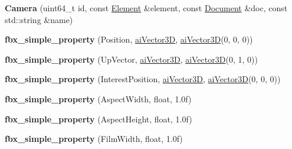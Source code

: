 \begin{DoxyCompactItemize}
\item 
\hypertarget{class_assimp_1_1_f_b_x_1_1_camera_afc7986cd32d068eb66a4b7536da0b2d3}{{\bfseries Camera} (uint64\+\_\+t id, const \hyperlink{class_assimp_1_1_f_b_x_1_1_element}{Element} \&element, const \hyperlink{class_assimp_1_1_f_b_x_1_1_document}{Document} \&doc, const std\+::string \&name)}\label{class_assimp_1_1_f_b_x_1_1_camera_afc7986cd32d068eb66a4b7536da0b2d3}

\item 
\hypertarget{class_assimp_1_1_f_b_x_1_1_camera_a432283ac3a72ec78a573ae61747e2d79}{{\bfseries fbx\+\_\+simple\+\_\+property} (Position, \hyperlink{structai_vector3_d}{ai\+Vector3\+D}, \hyperlink{structai_vector3_d}{ai\+Vector3\+D}(0, 0, 0))}\label{class_assimp_1_1_f_b_x_1_1_camera_a432283ac3a72ec78a573ae61747e2d79}

\item 
\hypertarget{class_assimp_1_1_f_b_x_1_1_camera_a74c72c781c2baacfdb92b7de23571573}{{\bfseries fbx\+\_\+simple\+\_\+property} (Up\+Vector, \hyperlink{structai_vector3_d}{ai\+Vector3\+D}, \hyperlink{structai_vector3_d}{ai\+Vector3\+D}(0, 1, 0))}\label{class_assimp_1_1_f_b_x_1_1_camera_a74c72c781c2baacfdb92b7de23571573}

\item 
\hypertarget{class_assimp_1_1_f_b_x_1_1_camera_a0a8fe58ff6ae3deb1b8fc87d4d50909d}{{\bfseries fbx\+\_\+simple\+\_\+property} (Interest\+Position, \hyperlink{structai_vector3_d}{ai\+Vector3\+D}, \hyperlink{structai_vector3_d}{ai\+Vector3\+D}(0, 0, 0))}\label{class_assimp_1_1_f_b_x_1_1_camera_a0a8fe58ff6ae3deb1b8fc87d4d50909d}

\item 
\hypertarget{class_assimp_1_1_f_b_x_1_1_camera_ade01185b9022eed3913149b8a8fb59d8}{{\bfseries fbx\+\_\+simple\+\_\+property} (Aspect\+Width, float, 1.\+0f)}\label{class_assimp_1_1_f_b_x_1_1_camera_ade01185b9022eed3913149b8a8fb59d8}

\item 
\hypertarget{class_assimp_1_1_f_b_x_1_1_camera_a8f69c4070e70355b041bd27ae52b02d7}{{\bfseries fbx\+\_\+simple\+\_\+property} (Aspect\+Height, float, 1.\+0f)}\label{class_assimp_1_1_f_b_x_1_1_camera_a8f69c4070e70355b041bd27ae52b02d7}

\item 
\hypertarget{class_assimp_1_1_f_b_x_1_1_camera_a7f781d11076a04c0c4664a3ca5044eec}{{\bfseries fbx\+\_\+simple\+\_\+property} (Film\+Width, float, 1.\+0f)}\label{class_assimp_1_1_f_b_x_1_1_camera_a7f781d11076a04c0c4664a3ca5044eec}


\end{DoxyCompactItemize}
